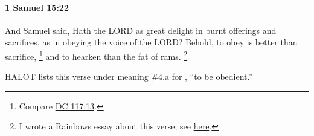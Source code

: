 		\paragraph{1 Samuel 15:22} %
			\label{1SAMUEL-15-22}

			And Samuel said, Hath the LORD as great delight in burnt offerings and sacrifices, as in obeying the voice of the LORD? Behold, to obey is better than sacrifice,%
				\footnote{%
					Compare \hyperref[DC117-13]{DC 117:13}.
					}
			and to hearken than the fat of rams.%
				\footnote{%
					I wrote a Rainbows essay about this verse; see \href{https://climbingtherainbows.substack.com/p/scripture-study-1-samuel-1522}{here}.
					}


			\begin{framed}
			\scriptsize
				\begin{compactdesc}
					\item[BHS] 
						\begin{compactenum}
							\item HALOT lists this verse under meaning \#4.a for , ``to be obedient.''
						\end{compactenum}
					\item[LXX]  \hyperref[AKOE]{} 
				\end{compactdesc}
			\end{framed}

